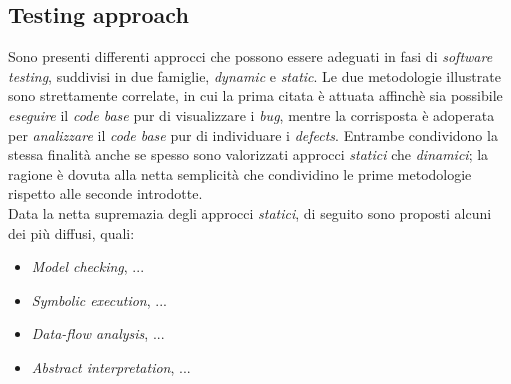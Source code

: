 \documentclass{article}
\begin{document}
\subsection*{Testing approach}
\large
Sono presenti differenti approcci che possono essere adeguati in fasi di \textit{software testing}, suddivisi in due famiglie, \textit{dynamic} e \textit{static}. Le due metodologie illustrate sono strettamente correlate, in cui la prima citata è attuata affinchè sia possibile \textit{eseguire} il \textit{code base} pur di visualizzare i \textit{bug}, mentre la corrisposta è adoperata per \textit{analizzare} il \textit{code base} pur di individuare i \textit{defects}. Entrambe condividono la stessa finalità anche se spesso sono valorizzati approcci \textit{statici} che \textit{dinamici}; la ragione è dovuta alla netta semplicità che condividino le prime metodologie rispetto alle seconde introdotte.\vspace*{14pt}\\
Data la netta supremazia degli approcci \textit{statici}, di seguito sono proposti alcuni dei più diffusi, quali:
\begin{itemize}[label={-}]
    \itemsep0em
    \item \textit{Model checking}, ...
    \item \textit{Symbolic execution}, ...
    \item \textit{Data-flow analysis}, ...
    \item \textit{Abstract interpretation}, ...  
\end{itemize} 
\end{document}
